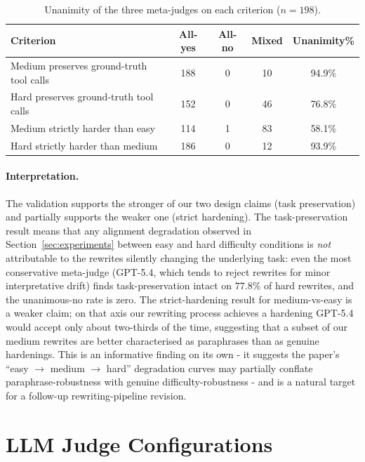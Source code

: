 \begin{table}[!htbp]
\centering
\small
\setlength{\tabcolsep}{6pt}
\renewcommand{\arraystretch}{1.1}
\caption{Unanimity of the three meta-judges on each criterion ($n = 198$).}
\label{tab:rewrite-validation-unanimity}
\begin{tabular}{@{}lcccc@{}}
\toprule
\textbf{Criterion} & \textbf{All-yes} & \textbf{All-no} & \textbf{Mixed} & \textbf{Unanimity\%} \\
\midrule
Medium preserves ground-truth tool calls        & 188 & 0 & 10 & 94.9\% \\
Hard preserves ground-truth tool calls          & 152 & 0 & 46 & 76.8\% \\
Medium strictly harder than easy                & 114 & 1 & 83 & 58.1\% \\
Hard strictly harder than medium                & 186 & 0 & 12 & 93.9\% \\
\bottomrule
\end{tabular}
\end{table}

\paragraph{Interpretation.}
The validation supports the stronger of our two design claims (task preservation) and partially supports the weaker one (strict hardening). The task-preservation result means that any alignment degradation observed in Section~\ref{sec:experiments} between easy and hard difficulty conditions is \emph{not} attributable to the rewrites silently changing the underlying task: even the most conservative meta-judge (GPT-5.4, which tends to reject rewrites for minor interpretative drift) finds task-preservation intact on $77.8\%$ of hard rewrites, and the unanimous-no rate is zero. The strict-hardening result for medium-vs-easy is a weaker claim; on that axis our rewriting process achieves a hardening GPT-5.4 would accept only about two-thirds of the time, suggesting that a subset of our medium rewrites are better characterised as paraphrases than as genuine hardenings. This is an informative finding on its own - it suggests the paper's ``easy $\rightarrow$ medium $\rightarrow$ hard'' degradation curves may partially conflate paraphrase-robustness with genuine difficulty-robustness - and is a natural target for a follow-up rewriting-pipeline revision.

\section{LLM Judge Configurations}
\label{app:judges}

